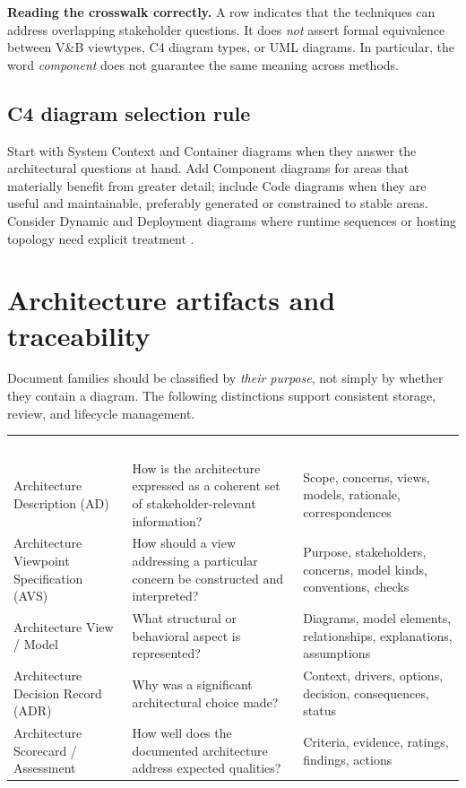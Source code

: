 \documentclass[11pt,letterpaper,oneside]{article}
\newcommand{\thead}[1]{\textcolor{white}{\bfseries #1}}
\begin{document}
\begin{keybox}
\textbf{Reading the crosswalk correctly.} A row indicates that the techniques can address overlapping stakeholder questions. It does \emph{not} assert formal equivalence between V\&B viewtypes, C4 diagram types, or UML diagrams. In particular, the word \emph{component} does not guarantee the same meaning across methods.
\end{keybox}

\subsection{C4 diagram selection rule}
Start with System Context and Container diagrams when they answer the architectural questions at hand. Add Component diagrams for areas that materially benefit from greater detail; include Code diagrams when they are useful and maintainable, preferably generated or constrained to stable areas. Consider Dynamic and Deployment diagrams where runtime sequences or hosting topology need explicit treatment \cite{c4diagrams,c4faq}.

\section{Architecture artifacts and traceability}\label{sec:artifacts}
Document families should be classified by \emph{their purpose}, not simply by whether they contain a diagram. The following distinctions support consistent storage, review, and lifecycle management.

\small
\begin{tabularx}{\textwidth}{@{}L{0.25\textwidth}Y L{0.20\textwidth}@{}}
\thead{Artifact family} & \thead{Primary question} & \thead{Typical contents}\\
Architecture Description (AD) & How is the architecture expressed as a coherent set of stakeholder-relevant information? & Scope, concerns, views, models, rationale, correspondences\\
Architecture Viewpoint Specification (AVS) & How should a view addressing a particular concern be constructed and interpreted? & Purpose, stakeholders, concerns, model kinds, conventions, checks\\
Architecture View / Model & What structural or behavioral aspect is represented? & Diagrams, model elements, relationships, explanations, assumptions\\
Architecture Decision Record (ADR) & Why was a significant architectural choice made? & Context, drivers, options, decision, consequences, status\\
Architecture Scorecard / Assessment & How well does the documented architecture address expected qualities? & Criteria, evidence, ratings, findings, actions\\
\end{tabularx}
\normalsize
\end{document}
